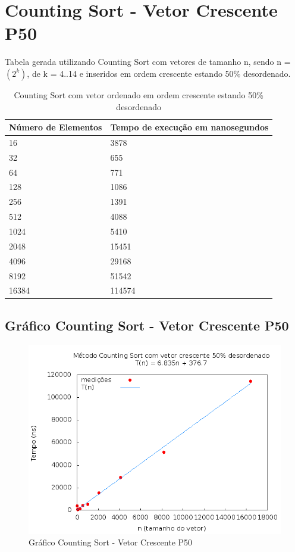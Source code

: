 \documentclass[12pt,a4paper,twoside]{report}
\begin{document}
\section{Counting Sort - Vetor Crescente P50}
Tabela gerada utilizando Counting Sort com vetores de tamanho n, sendo n = $(2^k)$, de k = 4..14 e inseridos em ordem crescente estando 50\% desordenado.
\begin{table}[H]
\centering
\caption{Counting Sort com vetor ordenado em ordem crescente estando 50\% desordenado}
\label{my-label}
\begin{tabular}{|l|l|}
\hline
\multicolumn{1}{|c|}{\textbf{Número de Elementos}} & \multicolumn{1}{c|}{\textbf{Tempo de execução em nanosegundos}} \\ \hline
16 & 3878 \\ \hline
32 & 655 \\ \hline
64 & 771 \\ \hline
128 & 1086 \\ \hline
256 & 1391 \\ \hline
512 & 4088 \\ \hline
1024 & 5410 \\ \hline
2048 & 15451 \\ \hline
4096 & 29168 \\ \hline
8192 & 51542 \\ \hline
16384 & 114574 \\ \hline
\end{tabular}
\end{table}

\subsection{Gráfico Counting Sort - Vetor Crescente P50}
\begin{figure}[H]
    \centering
    \includegraphics[width=0.7\linewidth]{graficos/CountingSort/vIntCrescenteP50/vIntCrescenteP50.png}
  \caption{Gráfico Counting Sort - Vetor Crescente P50}
\end{figure}
\end{document}
